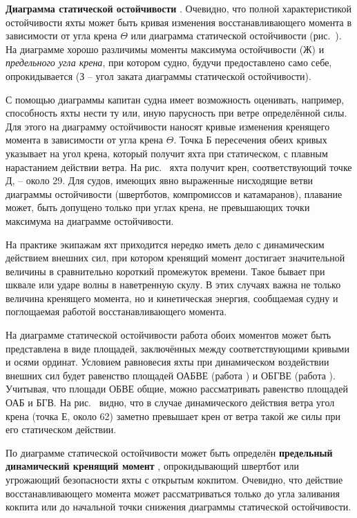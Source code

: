 \textbf{Диаграмма статической остойчивости}
.
Очевидно, что полной характеристикой остойчивости
яхты может быть кривая изменения восстанавливающего момента
 в зависимости от угла крена $\Theta$ или диаграмма
статической остойчивости (рис.~). На диаграмме хорошо различимы
моменты максимума остойчивости (Ж) и \textit{предельного угла крена}, при
котором судно, будучи предоставлено само себе, опрокидывается (З \---
угол заката диаграммы статической остойчивости).

С помощью диаграммы капитан судна имеет возможность оценивать,
например, способность яхты нести ту или, иную парусность при ветре
определённой силы. Для этого на диаграмму остойчивости наносят кривые
изменения кренящего момента  в зависимости от угла крена
$\Theta$. Точка Б пересечения обеих кривых указывает на угол крена,
который получит яхта при статическом, с плавным нарастанием действии
ветра. На рис.~ яхта получит крен, соответствующий точке Д,
\--- около 29\gr. Для судов, имеющих явно выраженные нисходящие ветви
диаграммы остойчивости (швертботов, компромиссов и катамаранов),
плавание может, быть допущено только при углах крена, не превышающих
точки максимума на диаграмме остойчивости.

На практике экипажам яхт приходится нередко иметь дело с динамическим
действием внешних сил, при котором кренящий момент достигает
значительной величины в сравнительно короткий промежуток
времени. Такое бывает при шквале или ударе волны в наветренную
скулу. В этих случаях важна не только величина кренящего момента, но и
кинетическая энергия, сообщаемая судну и поглощаемая работой
восстанавливающего момента.

На диаграмме статической остойчивости работа обоих моментов может быть
представлена в виде площадей, заключённых между соответствующими
кривыми и осями ординат. Условием равновесия яхты при динамическом
воздействии внешних сил будет равенство площадей ОАБВЕ (работа
) и ОБГВЕ (работа ). Учитывая, что площади ОБВЕ
общие, можно рассматривать равенство площадей ОАБ и БГВ. На
рис.~ видно, что в случае динамического действия ветра угол
крена (точка Е, около 62\gr) заметно превышает крен от ветра такой же
силы при его статическом действии.

По диаграмме статической остойчивости может быть определён
\textbf{предельный динамический кренящий момент}
, опрокидывающий
швертбот или угрожающий безопасности яхты с открытым
кокпитом. Очевидно, что действие восстанавливающего момента может
рассматриваться только до угла заливания кокпита или до начальной
точки снижения диаграммы статической остойчивости.

